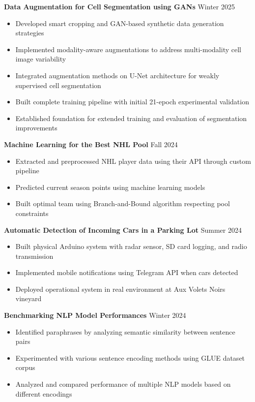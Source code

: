 \documentclass[11pt,a4paper]{article}
\newcommand{\projectitem}[3]{
\noindent
  \textbf{#1} \hfill #2 
  #3 \vspace{6pt}
}
\begin{document}
\projectitem{Data Augmentation for Cell Segmentation using GANs}{Winter 2025}{
  \begin{itemize}
    \item Developed smart cropping and GAN-based synthetic data generation strategies
    \item Implemented modality-aware augmentations to address multi-modality cell image variability
    \item Integrated augmentation methods on U-Net architecture for weakly supervised cell segmentation
    \item Built complete training pipeline with initial 21-epoch experimental validation
    \item Established foundation for extended training and evaluation of segmentation improvements
  \end{itemize}
}

\projectitem{Machine Learning for the Best NHL Pool}{Fall 2024}{
  \begin{itemize}
    \item Extracted and preprocessed NHL player data using their API through custom pipeline
    \item Predicted current season points using machine learning models
    \item Built optimal team using Branch-and-Bound algorithm respecting pool constraints
  \end{itemize}
}

\projectitem{Automatic Detection of Incoming Cars in a Parking Lot}{Summer 2024}{
  \begin{itemize}
    \item Built physical Arduino system with radar sensor, SD card logging, and radio transmission
    \item Implemented mobile notifications using Telegram API when cars detected
    \item Deployed operational system in real environment at Aux Volets Noirs vineyard
  \end{itemize}
}

\projectitem{Benchmarking NLP Model Performances}{Winter 2024}{
  \begin{itemize}
    \item Identified paraphrases by analyzing semantic similarity between sentence pairs
    \item Experimented with various sentence encoding methods using GLUE dataset corpus
    \item Analyzed and compared performance of multiple NLP models based on different encodings
  \end{itemize}
}
\end{document}
